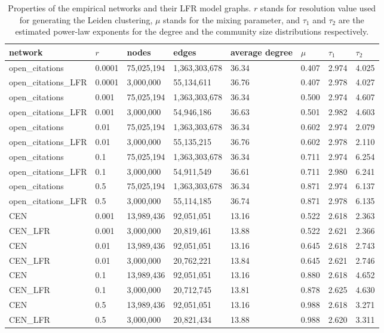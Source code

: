\documentclass[a4paper]{article}   	%
\begin{document}
\begin{table}[h!]
\caption[Properties of the empirical networks and their LFR model graphs.]{Properties of the empirical networks and their LFR model graphs. $r$ stands for resolution value used for generating the Leiden clustering, $\mu$ stands for the mixing parameter, and $\tau_1$ and $\tau_2$ are the estimated power-law exponents for the degree and the community size distributions respectively.}
\centering
\begin{tabular}{llllllll}
\hline
network              & $r$      & nodes      & edges         & average degree & $\mu$    & $\tau_1$  & $\tau_2$  \\ \hline \hline
open\_citations      & 0.0001 & 75,025,194 & 1,363,303,678 & 36.34    & 0.407 & 2.974 & 4.025 \\
open\_citations\_LFR & 0.0001 & 3,000,000  & 55,134,611    & 36.76    & 0.407 & 2.978 & 4.027 \\\hline
open\_citations      & 0.001  & 75,025,194 & 1,363,303,678 & 36.34    & 0.500 & 2.974 & 4.607 \\
open\_citations\_LFR & 0.001  & 3,000,000  & 54,946,186    & 36.63    & 0.501 & 2.982 & 4.603 \\ \hline
open\_citations      & 0.01   & 75,025,194 & 1,363,303,678 & 36.34    & 0.602 & 2.974 & 2.079 \\
open\_citations\_LFR & 0.01   & 3,000,000  & 55,135,215    & 36.76    & 0.602 & 2.978 & 2.110 \\ \hline
open\_citations      & 0.1    & 75,025,194 & 1,363,303,678 & 36.34    & 0.711 & 2.974 & 6.254 \\
open\_citations\_LFR & 0.1    & 3,000,000  & 54,911,549    & 36.61    & 0.711 & 2.980 & 6.241 \\ \hline
open\_citations      & 0.5    & 75,025,194 & 1,363,303,678 & 36.34    & 0.871 & 2.974 & 6.137 \\
open\_citations\_LFR & 0.5    & 3,000,000  & 55,114,185    & 36.74    & 0.871 & 2.978 & 6.135 \\ \hline\hline
CEN      & 0.001 & 13,989,436 & 92,051,051 & 13.16    & 0.522 & 2.618 & 2.363 \\
CEN\_LFR & 0.001 & 3,000,000  & 20,819,461 & 13.88    & 0.522 & 2.621 & 2.366 \\ \hline
CEN      & 0.01  & 13,989,436 & 92,051,051 & 13.16    & 0.645 & 2.618 & 2.743 \\
CEN\_LFR & 0.01  & 3,000,000  & 20,762,221 & 13.84    & 0.645 & 2.621 & 2.746 \\ \hline
CEN      & 0.1   & 13,989,436 & 92,051,051 & 13.16    & 0.880 & 2.618 & 4.652 \\
CEN\_LFR & 0.1   & 3,000,000  & 20,712,745 & 13.81    & 0.878 & 2.625 & 4.630 \\ \hline
CEN      & 0.5   & 13,989,436 & 92,051,051 & 13.16    & 0.988 & 2.618 & 3.271 \\
CEN\_LFR & 0.5   & 3,000,000  & 20,821,434 & 13.88    & 0.988 & 2.620 & 3.311 \\ \hline
\end{tabular}
\end{table}
\end{document}

